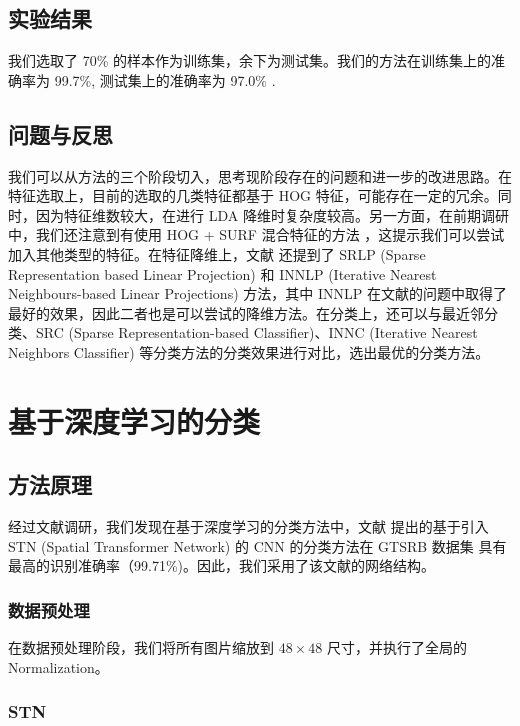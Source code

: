 \documentclass{report}
\begin{document}
\section{实验结果}

我们选取了 70\% 的样本作为训练集，余下为测试集。我们的方法在训练集上的准确率为 99.7\%, 测试集上的准确率为 97.0\% .

\section{问题与反思}

我们可以从方法的三个阶段切入，思考现阶段存在的问题和进一步的改进思路。在特征选取上，目前的选取的几类特征都基于 HOG 特征，可能存在一定的冗余。同时，因为特征维数较大，在进行 LDA 降维时复杂度较高。另一方面，在前期调研中，我们还注意到有使用 HOG + SURF 混合特征的方法 \cite{HOG-SURF}，这提示我们可以尝试加入其他类型的特征。在特征降维上，文献 \cite{Mathias} 还提到了 SRLP (Sparse Representation based Linear Projection) 和 INNLP (Iterative Nearest Neighbours-based Linear Projections) 方法，其中 INNLP 在文献的问题中取得了最好的效果，因此二者也是可以尝试的降维方法。在分类上，还可以与最近邻分类、SRC (Sparse Representation-based Classifier)、INNC (Iterative Nearest Neighbors Classifier) 等分类方法的分类效果进行对比，选出最优的分类方法。

\chapter{基于深度学习的分类}

\section{方法原理}

经过文献调研，我们发现在基于深度学习的分类方法中，文献 \cite{STN-CNN} 提出的基于引入 STN (Spatial Transformer Network) 的 CNN 的分类方法在 GTSRB 数据集 \cite{GTSRB} 具有最高的识别准确率（99.71\%)。因此，我们采用了该文献的网络结构。

\subsection{数据预处理}

在数据预处理阶段，我们将所有图片缩放到 $48 \times 48$ 尺寸，并执行了全局的 Normalization。

\subsection{STN}
\end{document}
